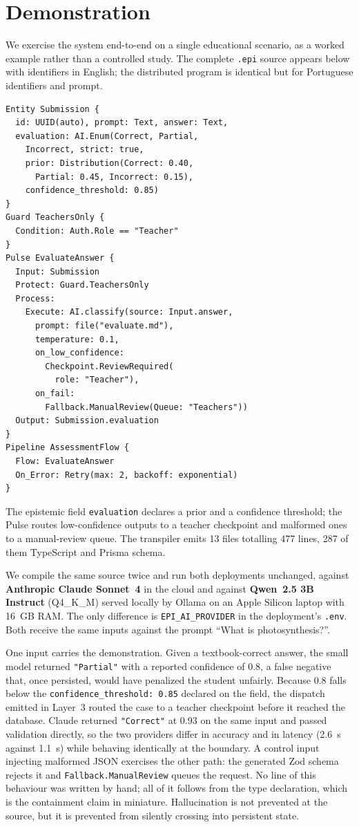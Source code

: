 \documentclass[sigconf]{acmart}
\begin{document}
\section{Demonstration}
\label{sec:demonstration}

We exercise the system end-to-end on a single educational scenario, as a worked example rather than a controlled study. The complete \texttt{.epi} source appears below with identifiers in English; the distributed program is identical but for Portuguese identifiers and prompt.

\begin{verbatim}
Entity Submission {
  id: UUID(auto), prompt: Text, answer: Text,
  evaluation: AI.Enum(Correct, Partial,
    Incorrect, strict: true,
    prior: Distribution(Correct: 0.40,
      Partial: 0.45, Incorrect: 0.15),
    confidence_threshold: 0.85)
}
Guard TeachersOnly {
  Condition: Auth.Role == "Teacher"
}
Pulse EvaluateAnswer {
  Input: Submission
  Protect: Guard.TeachersOnly
  Process:
    Execute: AI.classify(source: Input.answer,
      prompt: file("evaluate.md"),
      temperature: 0.1,
      on_low_confidence:
        Checkpoint.ReviewRequired(
          role: "Teacher"),
      on_fail:
        Fallback.ManualReview(Queue: "Teachers"))
  Output: Submission.evaluation
}
Pipeline AssessmentFlow {
  Flow: EvaluateAnswer
  On_Error: Retry(max: 2, backoff: exponential)
}
\end{verbatim}

The epistemic field \texttt{evaluation} declares a prior and a confidence threshold; the Pulse routes low-confidence outputs to a teacher checkpoint and malformed ones to a manual-review queue. The transpiler emits 13 files totalling 477 lines, 287 of them TypeScript and Prisma schema.

We compile the same source twice and run both deployments unchanged, against \textbf{Anthropic Claude Sonnet~4} in the cloud and against \textbf{Qwen~2.5 3B Instruct} (Q4\_K\_M) served locally by Ollama on an Apple Silicon laptop with 16~GB RAM. The only difference is \texttt{EPI\_AI\_PROVIDER} in the deployment's \texttt{.env}. Both receive the same inputs against the prompt ``What is photosynthesis?''.

One input carries the demonstration. Given a textbook-correct answer, the small model returned \texttt{"Partial"} with a reported confidence of 0.8, a false negative that, once persisted, would have penalized the student unfairly. Because 0.8 falls below the \texttt{confidence\_\allowbreak{}threshold:~0.85} declared on the field, the dispatch emitted in Layer~3 routed the case to a teacher checkpoint before it reached the database. Claude returned \texttt{"Correct"} at 0.93 on the same input and passed validation directly, so the two providers differ in accuracy and in latency (2.6~s against 1.1~s) while behaving identically at the boundary. A control input injecting malformed JSON exercises the other path: the generated Zod schema rejects it and \texttt{Fallback.\allowbreak ManualReview} queues the request. No line of this behaviour was written by hand; all of it follows from the type declaration, which is the containment claim in miniature. Hallucination is not prevented at the source, but it is prevented from silently crossing into persistent state.
\end{document}
